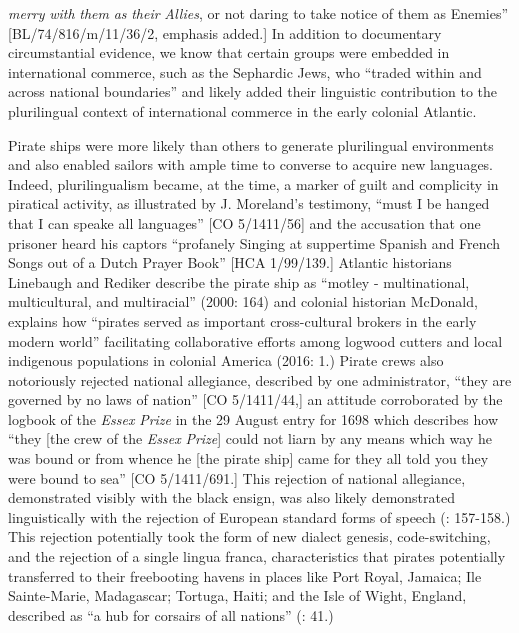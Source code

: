 \textit{merry} \textit{with} \textit{them} \textit{as} \textit{their} \textit{Allies}, or not daring to take notice of them as Enemies” [BL/74/816/m/11/36/2, emphasis added.] In addition to documentary circumstantial evidence, we know that certain groups were embedded in international commerce, such as the Sephardic Jews, who “traded within and across national boundaries” \citep[20]{Jarvis2010} and likely added their linguistic contribution to the plurilingual context of international commerce in the early colonial Atlantic. 

Pirate ships were more likely than others to generate plurilingual environments and also enabled sailors with ample time to converse to acquire new languages. Indeed, plurilingualism became, at the time, a marker of guilt and complicity in piratical activity, as illustrated by J. Moreland’s testimony, “must I be hanged that I can speake all languages” [CO 5/1411/56] and the accusation that one prisoner heard his captors “profanely Singing at suppertime Spanish and French Songs out of a Dutch Prayer Book” [HCA 1/99/139.] Atlantic historians Linebaugh and Rediker describe the pirate ship as “motley - multinational, multicultural, and multiracial” (2000: 164) and colonial historian McDonald, explains how “pirates served as important cross-cultural brokers in the early modern world” facilitating collaborative efforts among logwood cutters and local indigenous populations in colonial America (2016: 1.)  Pirate crews also notoriously rejected national allegiance, described by one administrator, “they are governed by no laws of nation” [CO 5/1411/44,] an attitude corroborated by the logbook of the \textit{Essex} \textit{Prize} in the 29 August entry for 1698 which describes how “they [the crew of the \textit{Essex} \textit{Prize}] could not liarn by any means which way he was bound or from whence he [the pirate ship] came for they all told you they were bound to sea” [CO 5/1411/691.] This rejection of national allegiance, demonstrated visibly with the black ensign, was also likely demonstrated linguistically with the rejection of European standard forms of speech (\citealt{Delgado2013}: 157-158.) This rejection potentially took the form of new dialect genesis, code-switching, and the rejection of a single lingua franca, characteristics that pirates potentially transferred to their freebooting havens in places like Port Royal, Jamaica; Ile Sainte-Marie, Madagascar; Tortuga, Haiti; and the Isle of Wight, England, described as “a hub for corsairs of all nations” (\citealt{Bicheno2012}: 41.) 

